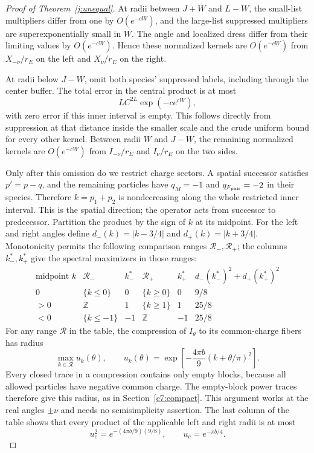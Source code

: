 \begin{proof}[Proof of Theorem~\ref{j:unequal}]
At radii between $J+W$ and $L-W$, the small-list multipliers differ
from one by $O(e^{-cW})$, and the large-list suppressed multipliers are
superexponentially small in $W$. The angle and localized dress differ
from their limiting values by $O(e^{-cW})$. Hence these normalized
kernels are $O(e^{-cW})$ from $X_{-\nu}/r_E$ on the left and
$X_{\nu}/r_E$ on the right.

At radii below $J-W$, omit both species' suppressed labels, including
through the center buffer. The total error in the central product is
at most
\[
 L C^{2L}\exp(-c e^{cW}),
\]
with zero error if this inner interval is empty. This follows directly
from suppression at that distance inside the smaller scale and the
crude uniform bound for every other kernel. Between radii $W$ and
$J-W$, the remaining normalized kernels are $O(e^{-cW})$ from
$I_{-\nu}/r_E$ and $I_{\nu}/r_E$ on the two sides.

Only after this omission do we restrict charge sectors. A spatial
successor satisfies $p'=p-q$, and the remaining particles have
$q_M=-1$ and $q_{F_{\rm pair}}=-2$ in their species. Therefore
$k=p_1+p_2$ is nondecreasing along the whole restricted inner interval.
This is the spatial direction; the operator acts from successor to
predecessor. Partition the product by the sign of $k$ at its midpoint.
For the left and right angles define
$d_-(k)=|k-3/4|$ and $d_+(k)=|k+3/4|$. Monotonicity permits the
following comparison ranges $\mathcal R_-,\mathcal R_+$; the columns
$k_-^*,k_+^*$ give the spectral maximizers in those ranges:
\[
\begin{array}{c|cc|cc|c}
 \text{midpoint }k&\mathcal R_-&k_-^*&\mathcal R_+&k_+^*&
 d_-(k_-^*)^2+d_+(k_+^*)^2\\\hline
 0&\{k\le0\}&0&\{k\ge0\}&0&9/8\\
 >0&\mathbb Z&1&\{k\ge1\}&1&25/8\\
 <0&\{k\le-1\}&-1&\mathbb Z&-1&25/8
\end{array}
\]
For any range $\mathcal R$ in the table, the
compression of $I_\theta$ to its common-charge fibers has radius
\[
 \max_{k\in\mathcal R}u_k(\theta),\qquad
 u_k(\theta)=\exp\!\left[-\frac{4\pi b}{9}
                              (k+\theta/\pi)^2\right].
\]
Every closed trace in a compression contains only empty blocks, because
all allowed particles have negative common charge. The empty-block power traces
therefore give this radius, as in Section~\ref{c7:compact}. This argument
works at the real angles $\pm\nu$ and needs no semisimplicity assertion.
The last column of the table shows that every product of the applicable
left and right radii is at most
\[
 u_c^2=e^{-(4\pi b/9)(9/8)},\qquad u_c=e^{-\pi b/4}.
\]


\end{proof}
